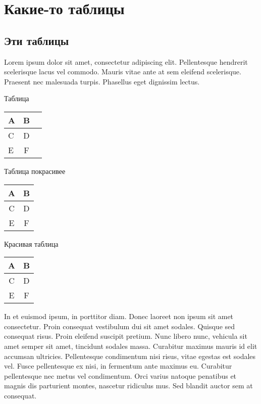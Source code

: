 \chapter{Какие-то таблицы}
\section{Эти таблицы}

Lorem ipsum dolor sit amet, consectetur adipiscing elit. Pellentesque hendrerit scelerisque lacus vel commodo. Mauris vitae ante at sem eleifend scelerisque. Praesent nec malesuada turpis. Phasellus eget dignissim lectus.

\begin{fixedtable}{Таблица}
	\begin{center}
        \begin{tabular}{|l|c|r|}
    		\hline
    		A & B \\
    		\hline
    		C & D \\
    		E & F \\
    		\hline
    	\end{tabular}
    \end{center}
\end{fixedtable}

\begin{fixedtable}{Таблица покрасивее}
	\begin{center}
        \begin{tabular}{cc}
        	\hline
        	A & B \\
        	\hline
        	C & D \\
        	E & F \\
        	\hline
        \end{tabular}
    \end{center}
\end{fixedtable}

\begin{fixedtable}{Красивая таблица}
    \begin{center}
        \begin{tabular}{cc}
        	\toprule
        	A & B \\
        	\midrule
        	C & D \\
        	E & F \\
        	\bottomrule
        \end{tabular}
    \end{center}
\end{fixedtable}

In et euismod ipsum, in porttitor diam. Donec laoreet non ipsum sit amet consectetur. Proin consequat vestibulum dui sit amet sodales. Quisque sed consequat risus. Proin eleifend suscipit pretium. Nunc libero nunc, vehicula sit amet semper sit amet, tincidunt sodales massa. Curabitur maximus mauris id elit accumsan ultricies. Pellentesque condimentum nisi risus, vitae egestas est sodales vel. Fusce pellentesque ex nisi, in fermentum ante maximus eu. Curabitur pellentesque nec metus vel condimentum. Orci varius natoque penatibus et magnis dis parturient montes, nascetur ridiculus mus. Sed blandit auctor sem at consequat.

